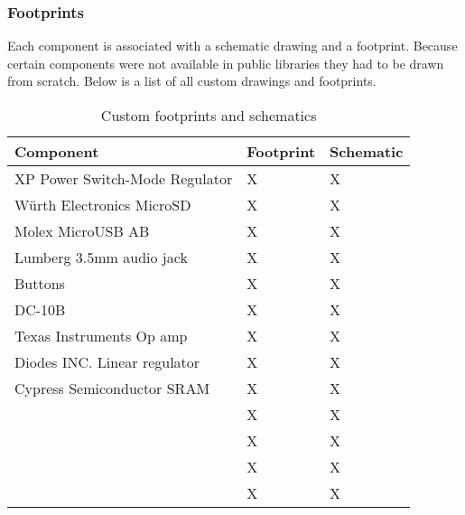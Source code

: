 \subsubsection{Footprints}

Each component is associated with a schematic drawing and a footprint. Because certain components were not available in public libraries they had to be drawn from scratch. Below is a list of all custom drawings and footprints.

\begin{table}[h]
	\centering
	\begin{tabular}{|l l l|}
		\hline
		\textbf{Component} & \textbf{Footprint}  & \textbf{Schematic} \\
		\hline
		XP Power Switch-Mode Regulator & X & X \\
		Würth Electronics MicroSD & X & X \\
		Molex MicroUSB AB & X & X \\
		Lumberg 3.5mm audio jack & X & X \\
		Buttons & X & X \\
		DC-10B & X & X \\
		Texas Instruments Op amp & X & X \\
		Diodes INC. Linear regulator& X & X \\
		Cypress Semiconductor SRAM & X & X \\
		& X & X \\
		& X & X \\
		& X & X \\
		& X & X \\
		\hline
	\end{tabular}
	\caption{Custom footprints and schematics}
	\label{tab:footprints}
\end{table}

